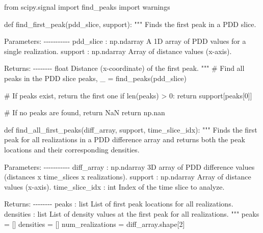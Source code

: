 \documentclass[
  11pt,
  letterpaper,
  DIV=11,
  numbers=noendperiod]{scrartcl}
\newenvironment{Shaded}{\begin{snugshade}}{\end{snugshade}}
\newcommand{\BuiltInTok}[1]{\textcolor[rgb]{0.00,0.23,0.31}{#1}}
\newcommand{\CommentTok}[1]{\textcolor[rgb]{0.37,0.37,0.37}{#1}}
\newcommand{\ControlFlowTok}[1]{\textcolor[rgb]{0.00,0.23,0.31}{#1}}
\newcommand{\DecValTok}[1]{\textcolor[rgb]{0.68,0.00,0.00}{#1}}
\newcommand{\ImportTok}[1]{\textcolor[rgb]{0.00,0.46,0.62}{#1}}
\newcommand{\KeywordTok}[1]{\textcolor[rgb]{0.00,0.23,0.31}{#1}}
\newcommand{\NormalTok}[1]{\textcolor[rgb]{0.00,0.23,0.31}{#1}}
\newcommand{\OperatorTok}[1]{\textcolor[rgb]{0.37,0.37,0.37}{#1}}
\begin{document}
\begin{Shaded}
\begin{Highlighting}[]
\ImportTok{from}\NormalTok{ scipy.signal }\ImportTok{import}\NormalTok{ find\_peaks}
\ImportTok{import}\NormalTok{ warnings}

\KeywordTok{def}\NormalTok{ find\_first\_peak(pdd\_slice, support):}
    \CommentTok{"""}
\CommentTok{    Finds the first peak in a PDD slice.}

\CommentTok{    Parameters:}
\CommentTok{    {-}{-}{-}{-}{-}{-}{-}{-}{-}{-}{-}}
\CommentTok{    pdd\_slice : np.ndarray}
\CommentTok{        A 1D array of PDD values for a single realization.}
\CommentTok{    support : np.ndarray}
\CommentTok{        Array of distance values (x{-}axis).}

\CommentTok{    Returns:}
\CommentTok{    {-}{-}{-}{-}{-}{-}{-}{-}}
\CommentTok{    float}
\CommentTok{        Distance (x{-}coordinate) of the first peak.}
\CommentTok{    """}
    \CommentTok{\# Find all peaks in the PDD slice}
\NormalTok{    peaks, \_ }\OperatorTok{=}\NormalTok{ find\_peaks(pdd\_slice)}

    \CommentTok{\# If peaks exist, return the first one}
    \ControlFlowTok{if} \BuiltInTok{len}\NormalTok{(peaks) }\OperatorTok{\textgreater{}} \DecValTok{0}\NormalTok{:}
        \ControlFlowTok{return}\NormalTok{ support[peaks[}\DecValTok{0}\NormalTok{]]}

    \CommentTok{\# If no peaks are found, return NaN}
    \ControlFlowTok{return}\NormalTok{ np.nan}

\KeywordTok{def}\NormalTok{ find\_all\_first\_peaks(diff\_array, support, time\_slice\_idx):}
    \CommentTok{"""}
\CommentTok{    Finds the first peak for all realizations in a PDD difference array and returns }
\CommentTok{    both the peak locations and their corresponding densities.}

\CommentTok{    Parameters:}
\CommentTok{    {-}{-}{-}{-}{-}{-}{-}{-}{-}{-}{-}}
\CommentTok{    diff\_array : np.ndarray}
\CommentTok{        3D array of PDD difference values (distances x time\_slices x realizations).}
\CommentTok{    support : np.ndarray}
\CommentTok{        Array of distance values (x{-}axis).}
\CommentTok{    time\_slice\_idx : int}
\CommentTok{        Index of the time slice to analyze.}

\CommentTok{    Returns:}
\CommentTok{    {-}{-}{-}{-}{-}{-}{-}{-}}
\CommentTok{    peaks : list}
\CommentTok{        List of first peak locations for all realizations.}
\CommentTok{    densities : list}
\CommentTok{        List of density values at the first peak for all realizations.}
\CommentTok{    """}
\NormalTok{    peaks }\OperatorTok{=}\NormalTok{ []}
\NormalTok{    densities }\OperatorTok{=}\NormalTok{ []}
\NormalTok{    num\_realizations }\OperatorTok{=}\NormalTok{ diff\_array.shape[}\DecValTok{2}\NormalTok{]}


\end{Highlighting}
\end{Shaded}
\end{document}
